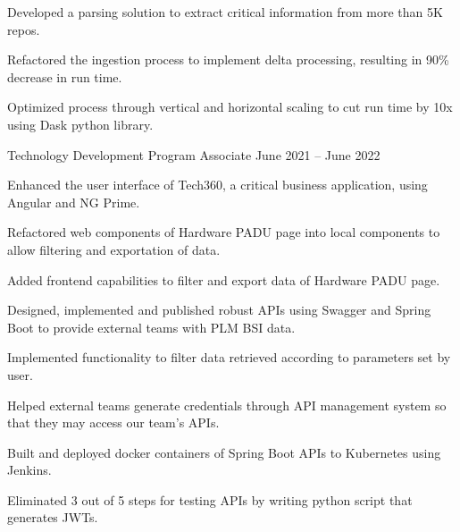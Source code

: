 \begin{cventries}
{\begin{cvitems}
        \item {Developed a parsing solution to extract critical information from more than 5K repos.}
        \item {Refactored the ingestion process to implement delta processing, resulting in 90\% decrease in run time.}
        \item {Optimized process through vertical and horizontal scaling to cut run time by 10x using Dask python library.}
      \end{cvitems}
    }
  \cventry
    {Technology Development Program Associate} %
    {} %
    {} %
    {June 2021 – June 2022} %
    {
      \begin{cvitems} %
        \item {Enhanced the user interface of Tech360, a critical business application, using Angular and NG Prime.}
        \item {Refactored web components of Hardware PADU page into local components to allow filtering and exportation of data.}
        \item {Added frontend capabilities to filter and export data of Hardware PADU page.}
        \item {Designed, implemented and published robust APIs using Swagger and Spring Boot to provide external teams with PLM BSI data.}
        \item {Implemented functionality to filter data retrieved according to parameters set by user.}
        \item {Helped external teams generate credentials through API management system so that they may access our team's APIs.}
        \item {Built and deployed docker containers of Spring Boot APIs to Kubernetes using Jenkins.}
        \item {Eliminated 3 out of 5 steps for testing APIs by writing python script that generates JWTs.}
      \end{cvitems}
    }

\end{cventries}
